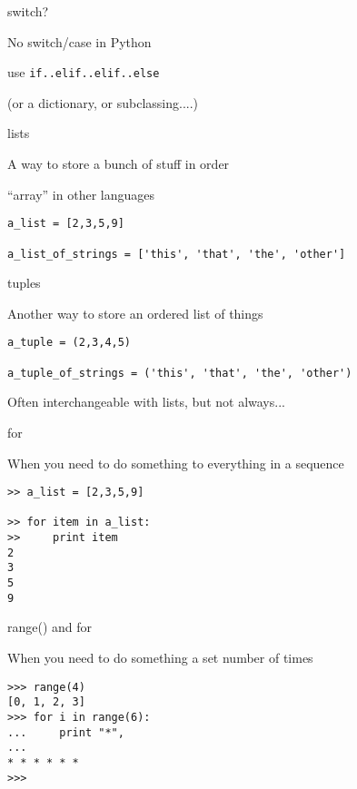 \documentclass{beamer}
\begin{document}
\begin{frame}[fragile]{switch?}

\vfill
{\Large No switch/case in Python}

\vfill
{\Large use \verb|if..elif..elif..else|}

\vfill

(or a dictionary, or subclassing....)
\end{frame}

\begin{frame}[fragile]{lists}

\vfill
{\Large A way to store a bunch of stuff in order}

\vfill
{\large ``array'' in other languages}

\vfill
\begin{verbatim}
a_list = [2,3,5,9]

a_list_of_strings = ['this', 'that', 'the', 'other']
\end{verbatim}

\vfill

\end{frame}

\begin{frame}[fragile]{tuples}

\vfill
{\Large Another way to store an ordered list of things}

\vfill
\begin{verbatim}
a_tuple = (2,3,4,5)

a_tuple_of_strings = ('this', 'that', 'the', 'other')
\end{verbatim}

\vfill
{\Large Often interchangeable with lists, but not always...}

\end{frame}


\begin{frame}[fragile]{for}

{\Large When you need to do something to everything in a sequence}

\vfill
\begin{verbatim}
>> a_list = [2,3,5,9]

>> for item in a_list:
>>     print item
2
3
5
9
\end{verbatim}

\end{frame}

\begin{frame}[fragile]{range() and for}

{\Large When you need to do something a set number of times}

\vfill
\begin{verbatim}
>>> range(4)
[0, 1, 2, 3]
>>> for i in range(6):
...     print "*",
... 
* * * * * *
>>> 
\end{verbatim}

\end{frame}
\end{document}
